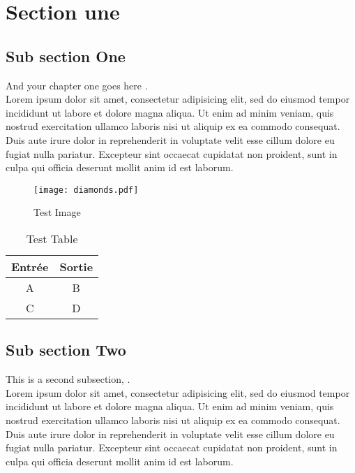 
\section{Section une}
\label{chap:sectionone}

\subsection{Sub section One}

And your chapter one goes here \cite{web001,Nom2012}. \\
  Lorem ipsum dolor sit amet, consectetur adipisicing elit, sed do eiusmod
  tempor incididunt ut labore et dolore magna aliqua. Ut enim ad minim veniam, quis nostrud exercitation ullamco laboris nisi ut aliquip ex ea commodo consequat. Duis aute irure dolor in reprehenderit in voluptate velit esse \cite{Bird02nltk:the}
  cillum dolore eu fugiat nulla pariatur. Excepteur sint occaecat cupidatat non
  proident, sunt in culpa qui officia deserunt mollit anim id est laborum.

  \begin{figure}[h]%
    \center%
    \texttt{[image: diamonds.pdf]}
    \caption[This is a test image]{Test Image}\label{fig:test}%
  \end{figure}


\begin{table}\begin{center}
\begin{tabular}{c|c}
Entrée & Sortie \\ \hline 
A & B \\
C & D
\end{tabular}
\caption{Test Table}\end{center}
\end{table}


\subsection{Sub section Two}

  This is a second subsection\cite{gen1972}, \cite{schaeffer99}. ~\\
  Lorem ipsum dolor sit amet, consectetur adipisicing elit, sed do eiusmod
  tempor incididunt ut labore et dolore magna aliqua. Ut enim ad minim veniam,
  quis nostrud exercitation ullamco laboris nisi ut aliquip ex ea commodo
  consequat. Duis aute irure dolor in reprehenderit in voluptate velit esse
  cillum dolore eu fugiat nulla pariatur. Excepteur sint occaecat cupidatat non
  proident, sunt in culpa qui officia deserunt mollit anim id est laborum.

